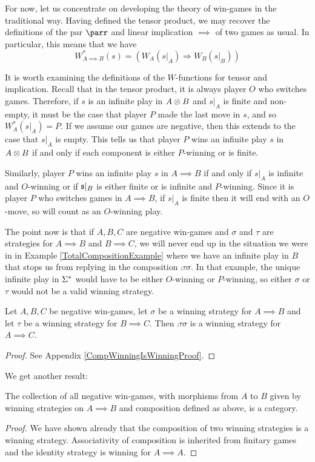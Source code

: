 \documentclass[11pt]{article} %
\begin{document}
For now, let us concentrate on developing the theory of win-games in the traditional way.  Having defined the tensor product, we may recover the definitions of the par $\parr$ and linear implication $\implies$ of two games as usual.  In particular, this means that we have
\[
  W_{A\implies B}^*(s) = (W_A(s\vert_A) \Rightarrow W_B(s\vert_B))
  \]

It is worth examining the definitions of the $W$-functions for tensor and implication.  Recall that in the tensor product, it is always player $O$ who switches games.  Therefore, if $s$ is an infinite play in $A\otimes B$ and $s\vert_A$ is finite and non-empty, it must be the case that player $P$ made the last move in $s$, and so $W_A^*(s\vert_A)=P$.  If we assume our games are negative, then this extends to the case that $s\vert_A$ is empty.  This tells us that player $P$ wins an infinite play $s$ in $A\otimes B$ if and only if each component is either $P$-winning or is finite.  

Similarly, player $P$ wins an infinite play $s$ in $A\implies B$ if and only if $s\vert_A$ is infinite and $O$-winning or if $\mathfrak s\vert_B$ is either finite or is infinite and $P$-winning.  Since it is player $P$ who switches games in $A\implies B$, if $s\vert_A$ is finite then it will end with an $O$-move, so will count as an $O$-winning play.  

The point now is that if $A,B,C$ are negative win-games and $\sigma$ and $\tau$ are strategies for $A\implies B$ and $B\implies C$, we will never end up in the situation we were in in Example \ref{TotalCompositionExample} where we have an infinite play in $B$ that stops us from replying in the composition $\comp\tau\sigma$.  In that example, the unique infinite play in ${\Sigma^*}$ would have to be either $O$-winning or $P$-winning, so either $\sigma$ or $\tau$ would not be a valid winning strategy.  

\begin{proposition}
  \label{CompWinningIsWinning}
  Let $A,B,C$ be negative win-games, let $\sigma$ be a winning strategy for $A\implies B$ and let $\tau$ be a winning strategy for $B\implies C$.  Then $\comp\tau\sigma$ is a winning strategy for $A\implies C$.  
  \begin{proof}
    See Appendix \ref{CompWinningIsWinningProof}.
  \end{proof}
\end{proposition}

We get another result:

\begin{theorem}
  The collection of all negative win-games, with morphisms from $A$ to $B$ given by winning strategies on $A\implies B$ and composition defined as above, is a category.
  \begin{proof}
    We have shown already that the composition of two winning strategies is a winning strategy.  Associativity of composition is inherited from finitary games and the identity strategy is winning for $A\implies A$.  
  \end{proof}
\end{theorem}
\end{document}
